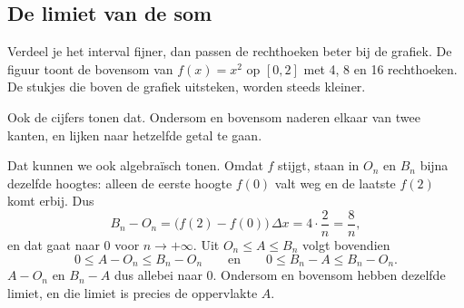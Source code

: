 \begin{oefeningen}
\end{oefeningen}

\subsection{De limiet van de som}

Verdeel je het interval fijner, dan passen de rechthoeken beter bij de grafiek. De figuur toont de bovensom van $f(x) = x^2$ op $[0, 2]$ met 4, 8 en 16 rechthoeken. De stukjes die boven de grafiek uitsteken, worden steeds kleiner.


Ook de cijfers tonen dat. Ondersom en bovensom naderen elkaar van twee kanten, en lijken naar hetzelfde getal te gaan.


Dat kunnen we ook algebraïsch tonen. Omdat $f$ stijgt, staan in $O_n$ en $B_n$ bijna dezelfde hoogtes: alleen de eerste hoogte $f(0)$ valt weg en de laatste $f(2)$ komt erbij. Dus
\[ B_n - O_n = \bigl(f(2) - f(0)\bigr)\,\Delta x = 4 \cdot \frac{2}{n} = \frac{8}{n} , \]
en dat gaat naar 0 voor $n \to +\infty$. Uit $O_n \leqslant A \leqslant B_n$ volgt bovendien
\[ 0 \leqslant A - O_n \leqslant B_n - O_n \qquad\text{en}\qquad 0 \leqslant B_n - A \leqslant B_n - O_n . \]
 $A - O_n$ en $B_n - A$ dus allebei naar 0. Ondersom en bovensom hebben dezelfde limiet, en die limiet is precies de oppervlakte $A$.

